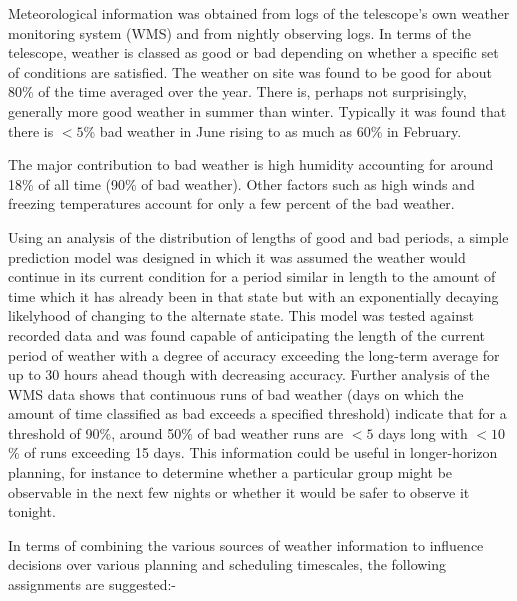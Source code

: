  Meteorological information was obtained from logs of the telescope's own weather monitoring system (WMS) and from nightly observing logs. In terms of the telescope, weather is classed as good or bad depending on whether a specific set of conditions are satisfied. The weather on site was found to be good for about 80\% of the time averaged over the year. There is, perhaps not surprisingly, generally more good weather in summer than winter. Typically it was found that there is $<5$\% bad weather in June rising to as much as 60\% in February.

 The major contribution to bad weather is high humidity accounting for around 18\% of all time (90\% of bad weather). Other factors such as high winds and freezing temperatures account for only a few percent of the bad weather. 

Using an analysis of the distribution of lengths of good and bad periods, a simple prediction model was designed in which it was assumed the weather would continue in its current condition for a period similar in length to the amount of time which it has already been in that state but with an exponentially decaying likelyhood of changing to the alternate state. This model was tested against recorded data and was found capable of anticipating the length of the current period of weather with a degree of accuracy exceeding the long-term average for up to 30 hours ahead though with decreasing accuracy. 
Further analysis of the WMS data shows that continuous runs of bad weather (days on which the amount of time classified as bad exceeds a specified threshold) indicate that for a threshold of 90\%, around 50\% of bad weather runs are $<5$ days long with $<10$\% of runs exceeding 15 days. This information could be useful in longer-horizon planning, for instance to determine whether a particular group might be observable in the next few nights or whether it would be safer to observe it tonight.

In terms of combining the various sources of weather information to influence decisions over various planning and scheduling timescales, the following assignments are suggested:-

